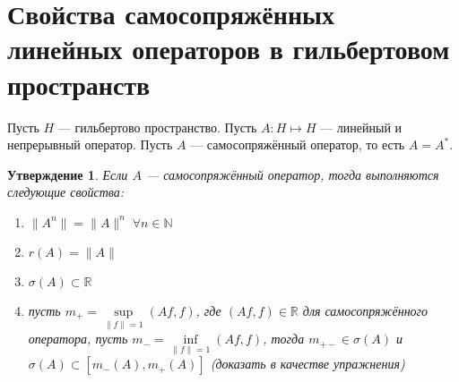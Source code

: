 \documentclass[12pt]{article}
\begin{document}
\newtheorem{Theor}{Теорема}
\newtheorem{Utv}{Утверждение}
\newtheorem{Opr}{Опреление}
\newtheorem{Prim}{Пример}
\newtheorem{Upr}{Упражнение}
\newtheorem{Nabl}{Наблюдение}
\newtheorem{Zam}{Замечание}
\section*{Свойства самосопряжённых линейных операторов в гильбертовом
пространств}
Пусть $H$ --- гильбертово пространство.
Пусть $A : H \mapsto H$ --- линейный и непрерывный оператор.
Пусть $A$ --- самосопряжённый оператор, то есть $A = A^*$.
\begin{Utv}
    Если $A$ --- самосопряжённый оператор, тогда выполняются следующие
    свойства:
    \begin{enumerate}
        \item{$\|A^n\| = \|A\|^n\; \forall n \in \mathbb N$}
        \item{$r(A) = \|A\|$}
        \item{$\sigma(A) \subset \mathbb R$}
        \item{пусть $m_+ = \sup \limits_{\|f\| = 1} (Af, f)$, где $(Af, f) \in 
                \mathbb R$ для самосопряжённого оператора, пусть $m_- = \inf 
                \limits_{\|f\| = 1} (Af, f)$, тогда $m_{+-} \in \sigma(A)$ и
                $\sigma(A) \subset [m_-(A), m_+(A)]$ (доказать в качестве
            упражнения)}
    \end{enumerate}
\end{Utv}
\end{document}
